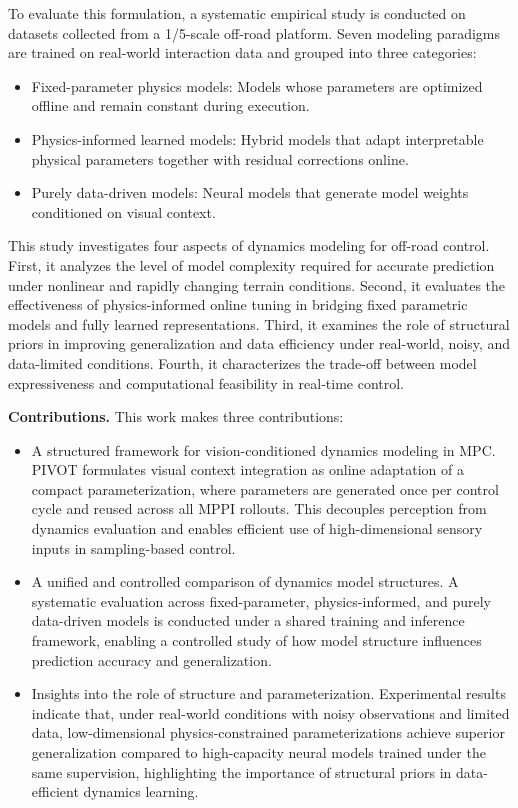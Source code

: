To evaluate this formulation, a systematic empirical study is conducted on datasets collected from a 1/5-scale off-road platform. Seven modeling paradigms are trained on real-world interaction data and grouped into three categories:

\begin{itemize}
\item Fixed-parameter physics models: Models whose parameters are optimized offline and remain constant during execution.
\item Physics-informed learned models: Hybrid models that adapt interpretable physical parameters together with residual corrections online.
\item Purely data-driven models: Neural models that generate model weights conditioned on visual context.
\end{itemize}

This study investigates four aspects of dynamics modeling for off-road control. First, it analyzes the level of model complexity required for accurate prediction under nonlinear and rapidly changing terrain conditions. Second, it evaluates the effectiveness of physics-informed online tuning in bridging fixed parametric models and fully learned representations. Third, it examines the role of structural priors in improving generalization and data efficiency under real-world, noisy, and data-limited conditions. Fourth, it characterizes the trade-off between model expressiveness and computational feasibility in real-time control.

\textbf{Contributions.} This work makes three contributions:

\begin{itemize}

\item A structured framework for vision-conditioned dynamics modeling in MPC.  
PIVOT formulates visual context integration as online adaptation of a compact parameterization, where parameters are generated once per control cycle and reused across all MPPI rollouts. This decouples perception from dynamics evaluation and enables efficient use of high-dimensional sensory inputs in sampling-based control.

\item A unified and controlled comparison of dynamics model structures.  
A systematic evaluation across fixed-parameter, physics-informed, and purely data-driven models is conducted under a shared training and inference framework, enabling a controlled study of how model structure influences prediction accuracy and generalization.

\item Insights into the role of structure and parameterization.  
Experimental results indicate that, under real-world conditions with noisy observations and limited data, low-dimensional physics-constrained parameterizations achieve superior generalization compared to high-capacity neural models trained under the same supervision, highlighting the importance of structural priors in data-efficient dynamics learning.

\end{itemize}